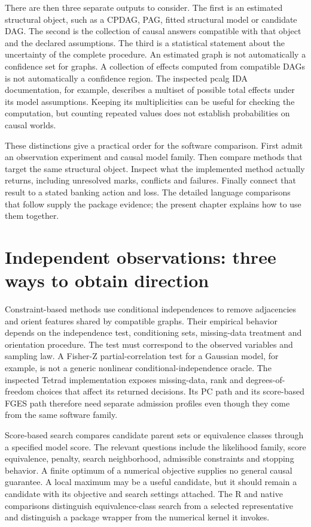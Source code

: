 There are then three separate outputs to consider. The first is an estimated
structural object, such as a CPDAG, PAG, fitted structural model or candidate
DAG. The second is the collection of causal answers compatible with that
object and the declared assumptions. The third is a statistical statement
about the uncertainty of the complete procedure. An estimated graph is not
automatically a confidence set for graphs. A collection of effects computed
from compatible DAGs is not automatically a confidence region. The inspected
pcalg IDA documentation, for example, describes a multiset of possible total
effects under its model assumptions. Keeping its multiplicities can be useful
for checking the computation, but counting repeated values does not establish
probabilities on causal worlds. \citep{exec13_pcalg,exec13_pcalg_reuse_primary}

These distinctions give a practical order for the software comparison. First
admit an observation experiment and causal model family. Then compare methods
that target the same structural object. Inspect what the implemented method
actually returns, including unresolved marks, conflicts and failures. Finally
connect that result to a stated banking action and loss. The detailed language
comparisons that follow supply the package evidence; the present chapter
explains how to use them together.

\section{Independent observations: three ways to obtain direction}

Constraint-based methods use conditional independences to remove adjacencies
and orient features shared by compatible graphs. Their empirical behavior
depends on the independence test, conditioning sets, missing-data treatment
and orientation procedure. The test must correspond to the observed variables
and sampling law. A Fisher-Z partial-correlation test for a Gaussian model,
for example, is not a generic nonlinear conditional-independence oracle.
The inspected Tetrad implementation exposes missing-data, rank and
degrees-of-freedom choices that affect its returned decisions. Its PC path
and its score-based FGES path therefore need separate admission profiles even
though they come from the same software family. \citep{exec13_java_tetrad}

Score-based search compares candidate parent sets or equivalence classes
through a specified model score. The relevant questions include the likelihood
family, score equivalence, penalty, search neighborhood, admissible constraints
and stopping behavior. A finite optimum of a numerical objective supplies no
general causal guarantee. A local maximum may be a useful candidate, but it
should remain a candidate with its objective and search settings attached.
The R and native comparisons distinguish equivalence-class search from a
selected representative and distinguish a package wrapper from the numerical
kernel it invokes. \citep{exec13_pcalg,exec13_cxx_xges,exec16_ct_pcalg}

